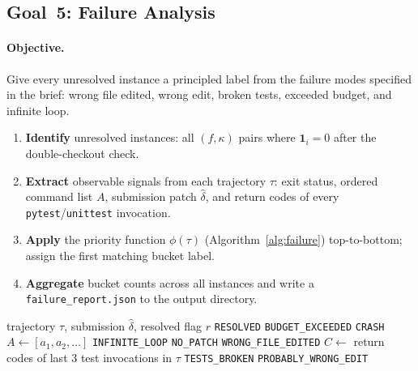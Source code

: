 \documentclass[11pt]{article}
\begin{document}
\subsection{Goal~5: Failure Analysis}
\label{sec:goal-failure}

\paragraph{Objective.}
Give every unresolved instance a principled label from the failure modes
specified in the brief: wrong file edited, wrong edit, broken tests,
exceeded budget, and infinite loop.

\begin{enumerate}[leftmargin=*,label=\textbf{Step~\arabic*.}]
  \item \textbf{Identify} unresolved instances: all $(f, \kappa)$ pairs
        where $\mathbf{1}_i = 0$ after the double-checkout check.
  \item \textbf{Extract} observable signals from each trajectory $\tau$:
        exit status, ordered command list $A$, submission patch $\hat{\delta}$,
        and return codes of every \texttt{pytest}/\texttt{unittest}
        invocation.
  \item \textbf{Apply} the priority function $\phi(\tau)$
        (Algorithm~\ref{alg:failure}) top-to-bottom; assign the first
        matching bucket label.
  \item \textbf{Aggregate} bucket counts across all instances and write a
        \texttt{failure\_report.json} to the output directory.
\end{enumerate}

\begin{algorithm}[ht]
\caption{Failure classification $\phi(\tau)$
         (\texttt{projectk/failure\_analysis.py::classify\_trajectory})}
\label{alg:failure}
\begin{algorithmic}[1]
\Require trajectory $\tau$, submission $\hat{\delta}$, resolved flag $r$
 \Return \texttt{RESOLVED} \EndIf
{}
  \Return \texttt{BUDGET\_EXCEEDED}
\EndIf
{}
  \Return \texttt{CRASH}
\EndIf
\State $A \gets [a_1, a_2, \ldots]$
  \Return \texttt{INFINITE\_LOOP}
\EndIf
{}
  \Return \texttt{NO\_PATCH}
\EndIf
{}
  \Return \texttt{WRONG\_FILE\_EDITED}
\EndIf
\State $C \gets $ return codes of last 3 test invocations in $\tau$
  \Return \texttt{TESTS\_BROKEN}
\EndIf
\Return \texttt{PROBABLY\_WRONG\_EDIT}
\end{algorithmic}
\end{algorithm}
\end{document}
